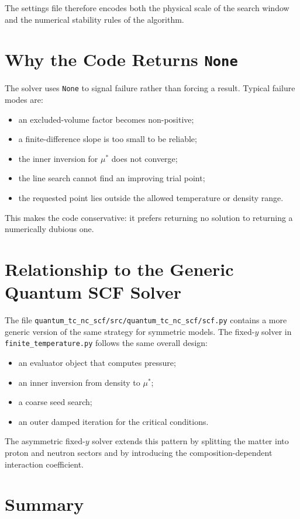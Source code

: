 \documentclass[11pt]{article}
\begin{document}
The settings file therefore encodes both the physical scale of the search
window and the numerical stability rules of the algorithm.

\section{Why the Code Returns \texttt{None}}

The solver uses \texttt{None} to signal failure rather than forcing a result.
Typical failure modes are:
\begin{itemize}
\item an excluded-volume factor becomes non-positive;
\item a finite-difference slope is too small to be reliable;
\item the inner inversion for $\mu^\ast$ does not converge;
\item the line search cannot find an improving trial point;
\item the requested point lies outside the allowed temperature or density range.
\end{itemize}

This makes the code conservative: it prefers returning no solution to returning
a numerically dubious one.

\section{Relationship to the Generic Quantum SCF Solver}

The file \texttt{quantum\_tc\_nc\_scf/src/quantum\_tc\_nc\_scf/scf.py}
contains a more generic version of the same strategy for symmetric models. The
fixed-$y$ solver in \texttt{finite\_temperature.py} follows the same overall
design:
\begin{itemize}
\item an evaluator object that computes pressure;
\item an inner inversion from density to $\mu^\ast$;
\item a coarse seed search;
\item an outer damped iteration for the critical conditions.
\end{itemize}

The asymmetric fixed-$y$ solver extends this pattern by splitting the matter
into proton and neutron sectors and by introducing the composition-dependent
interaction coefficient.

\section{Summary}
\end{document}

